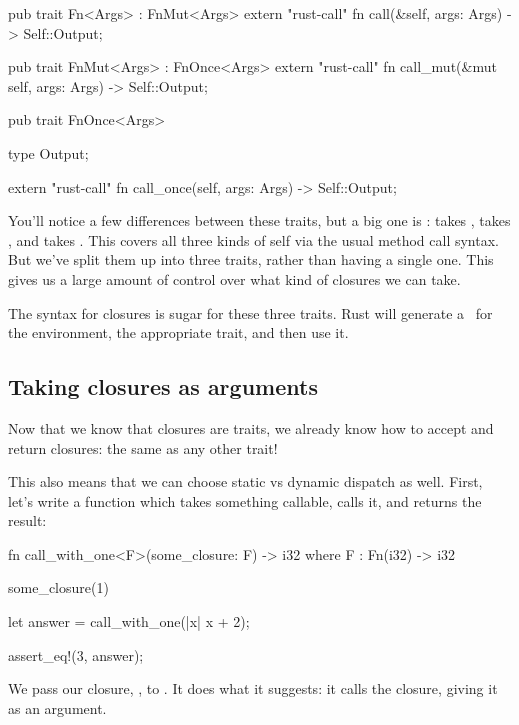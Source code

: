\begin{rustc}
pub trait Fn<Args> : FnMut<Args> {
    extern "rust-call" fn call(&self, args: Args) -> Self::Output;
}

pub trait FnMut<Args> : FnOnce<Args> {
    extern "rust-call" fn call_mut(&mut self, args: Args) -> Self::Output;
}

pub trait FnOnce<Args> {
    type Output;

    extern "rust-call" fn call_once(self, args: Args) -> Self::Output;
}
\end{rustc}

You'll notice a few differences between these traits, but a big one is :  takes ,  takes 
, and  takes . This covers all three kinds of self via the usual method call syntax. But we've 
split them up into three traits, rather than having a single one. This gives us a large amount of control over what kind of closures we 
can take.

\blank

The \code{|| \{\}} syntax for closures is sugar for these three traits. Rust will generate a \struct\ for the environment,  
the appropriate trait, and then use it.

\subsection*{Taking closures as arguments}

Now that we know that closures are traits, we already know how to accept and return closures: the same as any other trait!

\blank

This also means that we can choose static vs dynamic dispatch as well. First, let's write a function which takes something callable, 
calls it, and returns the result:

\begin{rustc}
fn call_with_one<F>(some_closure: F) -> i32
    where F : Fn(i32) -> i32 {

    some_closure(1)
}

let answer = call_with_one(|x| x + 2);

assert_eq!(3, answer);
\end{rustc}

We pass our closure, , to . It does what it suggests: it calls the closure, giving it  as 
an argument.

